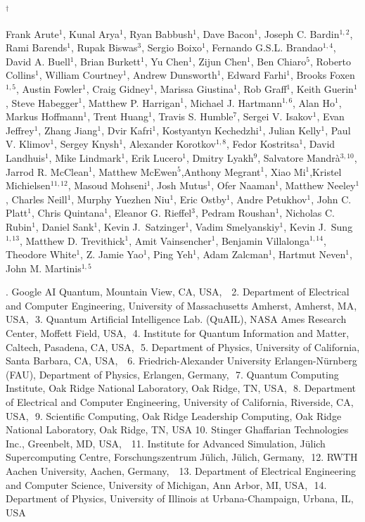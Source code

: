 \documentclass[%
 reprint,
superscriptaddress,
 amsmath,amssymb,
 pra,
]{revtex4-2}
\begin{document}
\vspace{2mm}
$^\dagger$ \small{ Frank Arute$^1$, Kunal Arya$^1$, Ryan Babbush$^1$, Dave Bacon$^1$, Joseph C. Bardin$^{1,2}$, 
Rami Barends$^1$, Rupak Biswas$^3$, Sergio Boixo$^1$, Fernando G.S.L. Brandao$^{1,4}$,  
David A. Buell$^1$, Brian Burkett$^1$, Yu Chen$^1$, Zijun Chen$^1$, Ben Chiaro$^5$, 
Roberto Collins$^1$, William Courtney$^1$, Andrew Dunsworth$^1$, Edward Farhi$^1$, Brooks Foxen$^{1,5}$, Austin Fowler$^1$, Craig Gidney$^1$, Marissa Giustina$^1$, Rob Graff$^1$, Keith Guerin$^1$, Steve Habegger$^1$, Matthew P. Harrigan$^1$, Michael J. Hartmann$^{1,6}$, Alan Ho$^1$, Markus Hoffmann$^1$, Trent Huang$^1$, Travis S. Humble$^7$, Sergei V. Isakov$^1$, Evan Jeffrey$^1$, Zhang Jiang$^1$, Dvir Kafri$^1$, Kostyantyn Kechedzhi$^1$, Julian Kelly$^1$, Paul V. Klimov$^1$, Sergey Knysh$^1$, Alexander Korotkov$^{1,8}$, Fedor Kostritsa$^1$, David Landhuis$^1$, Mike Lindmark$^1$, Erik Lucero$^1$, Dmitry Lyakh$^{9}$,
Salvatore Mandr\`{a}$^{3,10}$,
Jarrod R. McClean$^1$, Matthew McEwen$^5$,Anthony Megrant$^1$, Xiao Mi$^1$,Kristel Michielsen$^{11,12}$, 
Masoud Mohseni$^1$, Josh Mutus$^1$, Ofer Naaman$^1$, Matthew Neeley$^1$, Charles Neill$^1$, Murphy Yuezhen Niu$^1$, Eric Ostby$^1$, Andre Petukhov$^1$, John C. Platt$^1$, Chris Quintana$^1$, Eleanor G. Rieffel$^3$, Pedram Roushan$^1$, Nicholas C. Rubin$^1$, Daniel Sank$^1$, Kevin J.~Satzinger$^1$, Vadim Smelyanskiy$^1$, Kevin J.~Sung$^{1,13}$, Matthew D. Trevithick$^1$, Amit Vainsencher$^1$, Benjamin Villalonga$^{1,14}$, Theodore White$^1$, Z. Jamie Yao$^1$, Ping Yeh$^1$, Adam Zalcman$^1$, Hartmut Neven$^1$, John M. Martinis$^{1,5}$ 

. Google AI Quantum, Mountain View, CA, USA, \,\,
2. Department of Electrical and Computer Engineering, University of Massachusetts Amherst, Amherst, MA, USA,\,\,
3. Quantum Artificial Intelligence Lab. (QuAIL), NASA Ames Research Center, Moffett Field, USA,\,\,
4. Institute for Quantum Information and Matter, Caltech, Pasadena, CA, USA,\,\,
5. Department of Physics, University of California, Santa Barbara, CA, USA, \,\,
6. Friedrich-Alexander University Erlangen-N\"{u}rnberg (FAU), Department of Physics, Erlangen, Germany,\,\,
7. Quantum Computing Institute, Oak Ridge National Laboratory, Oak Ridge, TN, USA,\,\,
8.  Department of Electrical and Computer Engineering, University of California, Riverside, CA, USA,\,\,
9. Scientific Computing, Oak Ridge Leadership Computing, Oak Ridge National Laboratory, Oak Ridge, TN, USA
10. Stinger Ghaffarian Technologies Inc., Greenbelt, MD, USA, \,\,
11. Institute for Advanced Simulation, J\"{u}lich Supercomputing Centre, Forschungszentrum J\"{u}lich, J\"{u}lich, Germany,\,\,
12. RWTH Aachen University, Aachen, Germany, \,\,
13. Department of Electrical Engineering and Computer Science, University of Michigan, Ann Arbor, MI, USA,\,\,
14. Department of Physics, University of Illinois at Urbana-Champaign, Urbana, IL, USA
}
\end{document}
